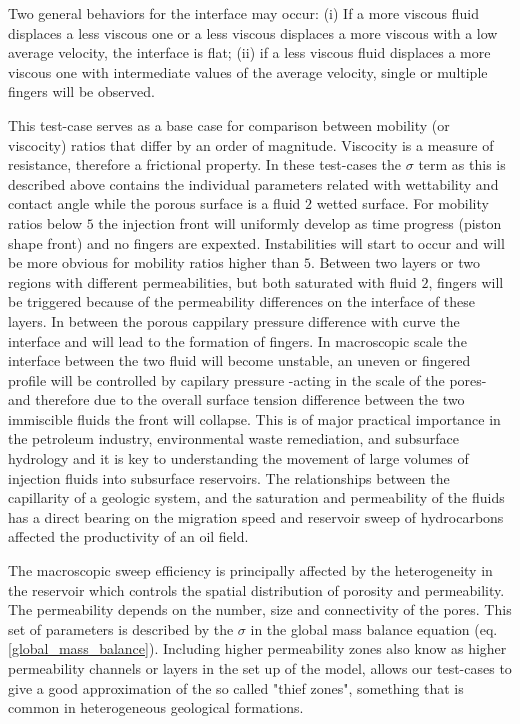 \documentclass[preprint,authoryear,12pt]{elsarticle}
\begin{document}
\medskip
Two general behaviors for the interface may occur: (i) If a more viscous fluid displaces a less viscous one or a less viscous displaces a more viscous with a low average velocity, the interface is flat; (ii) if a less viscous fluid displaces a more viscous one with intermediate values of the average velocity, single or multiple fingers will be observed.

\medskip
This test-case serves as a base case for comparison between mobility (or viscocity) ratios that differ by an order of magnitude. Viscocity is a measure of resistance, therefore a frictional property. In these test-cases the $\sigma$ term as this is described above contains the individual parameters related with wettability and contact angle while the porous surface is a fluid $2$ wetted surface. For mobility ratios below $5$ the injection front will uniformly develop as time progress (piston shape front) and no fingers are expexted. Instabilities will start to occur and will be more obvious for mobility ratios higher than $5$. Between two layers or two regions with different permeabilities, but both saturated with fluid $2$, fingers will be triggered because of the permeability differences on the interface of these layers. In between the porous cappilary pressure difference with curve the interface and will lead to the formation of fingers. In macroscopic scale the interface between the two fluid will become unstable, an uneven or fingered profile will be controlled by capilary pressure -acting in the scale of the pores- and therefore due to the overall surface tension difference between the two immiscible fluids the front will collapse. This is of major practical importance in the petroleum industry, environmental waste remediation, and subsurface hydrology and it is key to understanding the movement of large volumes of injection fluids into subsurface reservoirs. The relationships between the capillarity of a geologic system, and the saturation and permeability of the fluids has a direct bearing on the migration speed and reservoir sweep of hydrocarbons affected the productivity of an oil field.

\medskip
The macroscopic sweep efficiency is principally affected by the heterogeneity in the reservoir which controls the spatial distribution of porosity and permeability. The permeability depends on the number, size and connectivity of the pores. This set of parameters is described by the $\sigma$ in the global mass balance equation (eq.\ref{global_mass_balance}). Including higher permeability zones also know as higher permeability channels or layers in the set up of the model, allows our test-cases to give a good approximation of the so called "thief zones", something that is common in heterogeneous geological formations.
\end{document}
